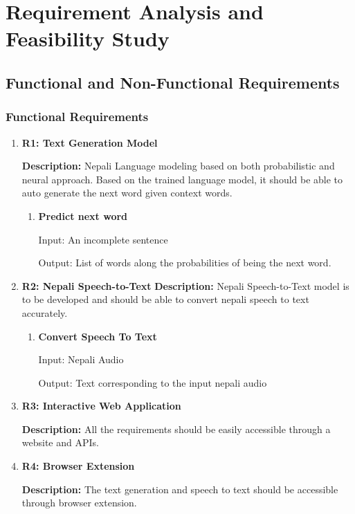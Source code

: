 \chapter{Requirement Analysis and Feasibility Study}
\section{Functional and Non-Functional Requirements}
\subsection{Functional Requirements}
\begin{enumerate}[font=\bfseries]
    \item \textbf{R1: Text Generation Model}

          \textbf{Description: }Nepali Language modeling based on both probabilistic and neural approach. Based on the trained language model, it should be able to auto generate the next word given context words.

          \begin{enumerate}
              \item \textbf{Predict next word}

                    Input: An incomplete sentence

                    Output: List of words along the probabilities of being the next word.
          \end{enumerate}
      
          \item \textbf{R2: Nepali Speech-to-Text}
          \textbf{Description: }Nepali Speech-to-Text model is to be developed and should be able to convert nepali speech to text accurately.

          \begin{enumerate}
            \item \textbf{Convert Speech To Text}
            
                  Input: Nepali Audio
                  
                  Output: Text corresponding to the input nepali audio  
          \end{enumerate}

    \item \textbf{R3: Interactive Web Application}
    
          \textbf{Description:} All the requirements should be easily accessible through a website and APIs.

          \item \textbf{R4: Browser Extension}
          
          \textbf{Description:} The text generation and speech to text should be accessible through browser extension.
\end{enumerate}


